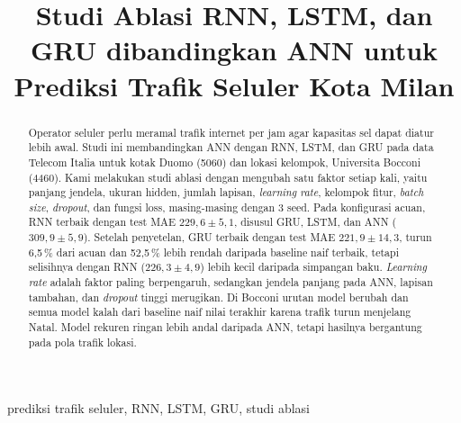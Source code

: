 \documentclass[conference,a4paper]{IEEEtran}
\begin{document}
 
\title{Studi Ablasi RNN, LSTM, dan GRU dibandingkan ANN untuk Prediksi Trafik Seluler Kota Milan}
 
\author{
\and
{}
\and
{}
}
 
\maketitle
 
\begin{abstract}
Operator seluler perlu meramal trafik internet per jam agar kapasitas sel dapat diatur lebih awal. Studi ini membandingkan ANN dengan RNN, LSTM, dan GRU pada data Telecom Italia untuk kotak Duomo (5060) dan lokasi kelompok, Universita Bocconi (4460). Kami melakukan studi ablasi dengan mengubah satu faktor setiap kali, yaitu panjang jendela, ukuran hidden, jumlah lapisan, \textit{learning rate}, kelompok fitur, \textit{batch size}, \textit{dropout}, dan fungsi loss, masing-masing dengan 3 seed. Pada konfigurasi acuan, RNN terbaik dengan test MAE $229{,}6 \pm 5{,}1$, disusul GRU, LSTM, dan ANN ($309{,}9 \pm 5{,}9$). Setelah penyetelan, GRU terbaik dengan test MAE $221{,}9 \pm 14{,}3$, turun 6,5\,\% dari acuan dan 52,5\,\% lebih rendah daripada baseline naif terbaik, tetapi selisihnya dengan RNN ($226{,}3 \pm 4{,}9$) lebih kecil daripada simpangan baku. \textit{Learning rate} adalah faktor paling berpengaruh, sedangkan jendela panjang pada ANN, lapisan tambahan, dan \textit{dropout} tinggi merugikan. Di Bocconi urutan model berubah dan semua model kalah dari baseline naif nilai terakhir karena trafik turun menjelang Natal. Model rekuren ringan lebih andal daripada ANN, tetapi hasilnya bergantung pada pola trafik lokasi.
\end{abstract}
 
\begin{IEEEkeywords}
prediksi trafik seluler, RNN, LSTM, GRU, studi ablasi
\end{IEEEkeywords}
 
\end{document}
